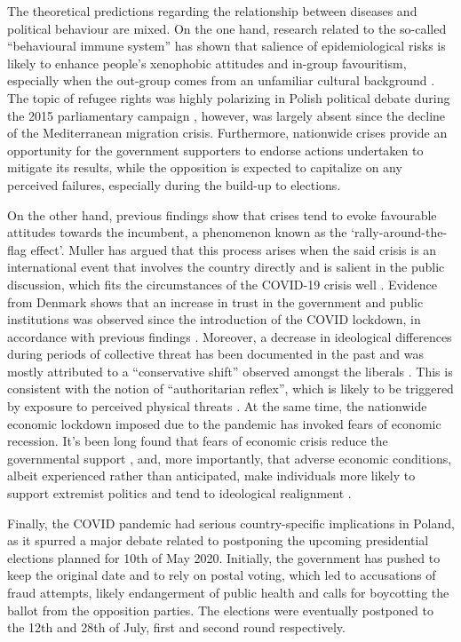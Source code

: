 \documentclass{article}
\begin{document}
	The theoretical predictions regarding the relationship between diseases and political behaviour are mixed. On the one hand, research related to the so-called “behavioural immune system” has shown that salience of epidemiological risks is likely to enhance people’s xenophobic attitudes and in-group favouritism, especially when the out-group comes from an unfamiliar cultural background \citep{faulkner2004, kim2016}. The topic of refugee rights was highly polarizing in Polish political debate during the 2015 parliamentary campaign \citep{matuszewski2018}, however, was largely absent since the decline of the Mediterranean migration crisis. Furthermore, nationwide crises provide an opportunity for the government supporters to endorse actions undertaken to mitigate its results, while the opposition is expected to capitalize on any perceived failures, especially during the build-up to elections. 
	
	On the other hand, previous findings show that crises tend to evoke favourable attitudes towards the incumbent, a phenomenon known as the ‘rally-around-the-flag effect’. Muller has argued that this process arises when the said crisis is an international event that involves the country directly and is salient in the public discussion, which fits the circumstances of the COVID-19 crisis well \citet{mueller1970}. Evidence from Denmark shows that an increase in trust in the government and public institutions was observed since the introduction of the COVID lockdown, in accordance with previous findings \citet{baekgaard2020}. Moreover, a decrease in ideological differences during periods of collective threat has been documented in the past and was mostly attributed to a “conservative shift” observed amongst the liberals \citep{bonanno2006, vandevyver2016}. This is consistent with the notion of “authoritarian reflex”, which is likely to be triggered by exposure to perceived physical threats \citet{norris2019}. At the same time, the nationwide economic lockdown imposed due to the pandemic has invoked fears of economic recession. It’s been long found that fears of economic crisis reduce the governmental support \citep{lewisbeck2000}, and, more importantly, that adverse economic conditions, albeit experienced rather than anticipated, make individuals more likely to support extremist politics and tend to ideological realignment \citep{autor2016}.
	
	Finally, the COVID pandemic had serious country-specific implications in Poland, as it spurred a major debate related to postponing the upcoming presidential elections planned for 10th of May 2020. Initially, the government has pushed to keep the original date and to rely on postal voting, which led to accusations of fraud attempts, likely endangerment of public health and calls for boycotting the ballot from the opposition parties. The elections were eventually postponed to the 12th and 28th of July, first and second round respectively.
	
\end{document}
